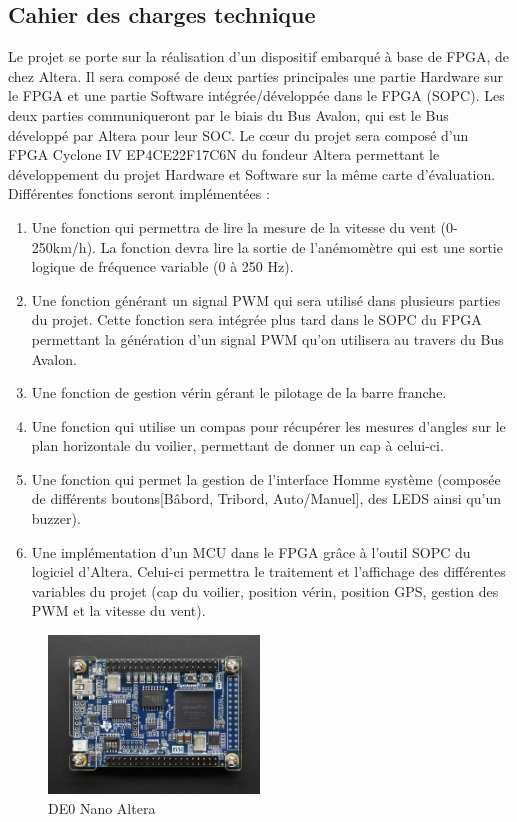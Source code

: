 \subsection{Cahier des charges technique}
Le projet se porte sur la réalisation d'un dispositif embarqué à base de FPGA, de chez Altera. Il sera composé de deux parties principales une partie Hardware sur le FPGA et une partie Software intégrée/développée dans le FPGA (SOPC). Les deux parties communiqueront par le biais du Bus Avalon, qui est le Bus développé par Altera pour leur SOC.
Le cœur du projet sera composé d'un FPGA Cyclone IV EP4CE22F17C6N du fondeur Altera permettant le développement du projet Hardware et Software sur la même carte d'évaluation. Différentes fonctions seront implémentées :
\vspace{0.75cm}
\begin{enumerate}
    \item Une fonction qui permettra de lire la mesure de la vitesse du vent (0-250km/h). La fonction devra lire la sortie de l'anémomètre qui est une sortie logique de fréquence variable (0 à 250 Hz). 
    \item Une fonction générant un signal PWM qui sera utilisé dans plusieurs parties du projet. Cette fonction sera intégrée plus tard dans le SOPC du FPGA permettant la génération d'un signal PWM qu'on utilisera au travers du Bus Avalon.
    \item Une fonction de gestion vérin gérant le pilotage de la barre franche.
    \item Une fonction qui utilise un compas pour récupérer les mesures d'angles sur le plan horizontale du voilier, permettant de donner un cap à celui-ci.
    \item Une fonction qui permet la gestion de l'interface Homme système (composée de différents boutons[Bâbord, Tribord, Auto/Manuel], des LEDS ainsi qu'un buzzer).
    \item Une implémentation d'un MCU dans le FPGA grâce à l'outil SOPC du logiciel d'Altera. Celui-ci permettra le traitement et l'affichage des différentes variables du projet (cap du voilier, position vérin, position GPS, gestion des PWM et la vitesse du vent).
\end{enumerate}

\begin{figure}[h]
  \begin{center}
    \includegraphics[width=0.5\textwidth]{images/DE0.jpg}
    \caption{DE0 Nano Altera}
  \end{center}
\end{figure}